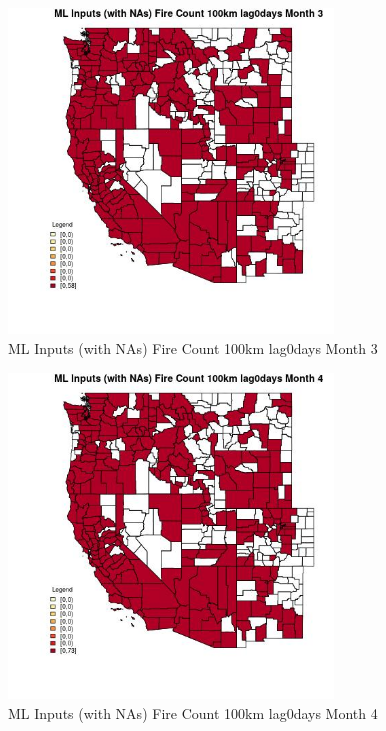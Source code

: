 \begin{figure} 
\centering  
\includegraphics[width=0.77\textwidth]{Code_Outputs/Report_ML_input_PM25_Step4_part_e_de_duplicated_aves_compiled_2019-05-21wNAs_CountyFire_Count_100km_lag0daysmedianMonth3.jpg} 
\caption{\label{fig:Report_ML_input_PM25_Step4_part_e_de_duplicated_aves_compiled_2019-05-21wNAsCountyFire_Count_100km_lag0daysmedianMonth3}ML Inputs (with NAs) Fire Count 100km lag0days Month 3} 
\end{figure} 
 

\begin{figure} 
\centering  
\includegraphics[width=0.77\textwidth]{Code_Outputs/Report_ML_input_PM25_Step4_part_e_de_duplicated_aves_compiled_2019-05-21wNAs_CountyFire_Count_100km_lag0daysmedianMonth4.jpg} 
\caption{\label{fig:Report_ML_input_PM25_Step4_part_e_de_duplicated_aves_compiled_2019-05-21wNAsCountyFire_Count_100km_lag0daysmedianMonth4}ML Inputs (with NAs) Fire Count 100km lag0days Month 4} 
\end{figure} 
 

